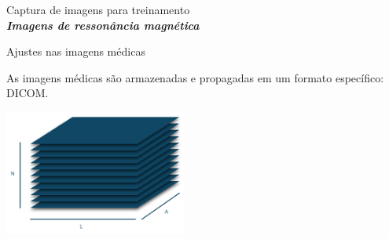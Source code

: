 \documentclass{beamer}
\begin{document}
\begin{frame}{Captura de imagens para treinamento}{\thesection \, \secname \\ \textbf{\textit{Imagens de ressonância magnética}}}
\begin{figure}
        \end{figure}


    \end{frame}

    \begin{frame}{Ajustes nas imagens médicas}{\thesection \, \secname}

        As imagens médicas são armazenadas e propagadas em um formato específico: DICOM. \cite{dicom_standard_history_2019, medical_connections_dicomobjects_2011, dicom_standard_current_2024, medical_connections_dicom_2007, weston_understanding_2020}

        \centering
        \includegraphics[width=6cm]{img/dicom_img.png} \\

    \end{frame}
\end{document}
